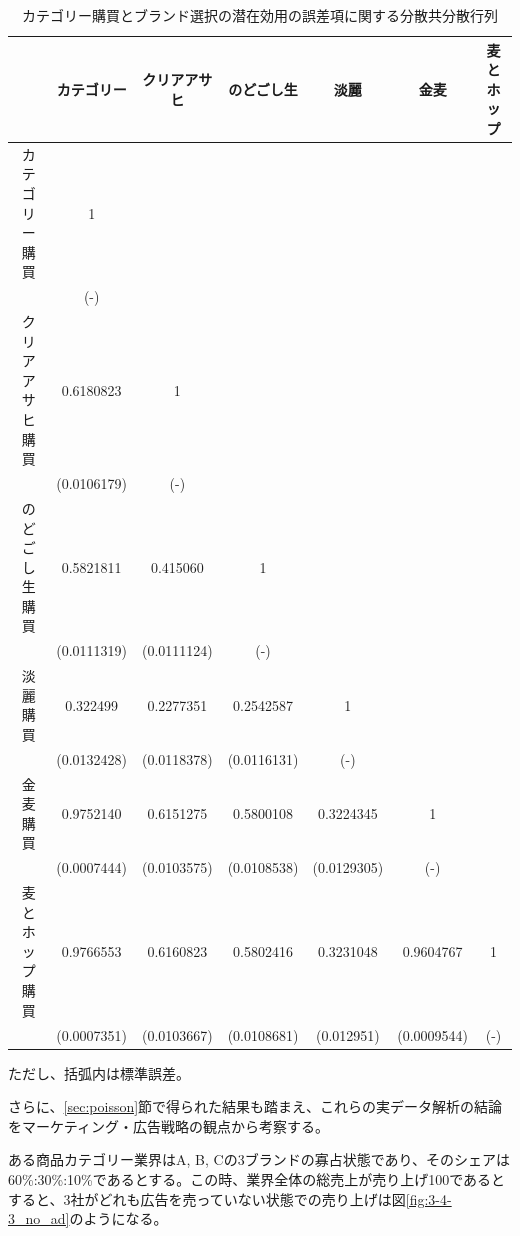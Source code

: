 \documentclass[11pt]{jsarticle}
\begin{document}
\begin{table}[htbp]
 \centering
  \caption{カテゴリー購買とブランド選択の潜在効用の誤差項に関する分散共分散行列}
\begin{center}
 \begin{tabular}{c|cccccc} \hline
   & カテゴリー & クリアアサヒ & のどごし生 & 淡麗 & 金麦 & 麦とホップ \\ \hline
カテゴリー購買 & 1 &  &  &  &  &  \\
   & (-) &  &  &  &  &  \\
クリアアサヒ購買 & 0.6180823 & 1 &  &  &  &  \\
 & (0.0106179) & (-) &  &  &  &  \\
のどごし生購買 & 0.5821811 & 0.415060 & 1 &  &  &  \\
 & (0.0111319) & (0.0111124) & (-) &  &  &  \\
淡麗購買 & 0.322499 & 0.2277351 & 0.2542587 & 1 &  &  \\
 & (0.0132428) & (0.0118378) & (0.0116131) & (-) &  &  \\
金麦購買 & 0.9752140 & 0.6151275 & 0.5800108 & 0.3224345 & 1 &  \\
 & (0.0007444) & (0.0103575) & (0.0108538) & (0.0129305) & (-) &  \\
麦とホップ購買 & 0.9766553 & 0.6160823 & 0.5802416 & 0.3231048 & 0.9604767 & 1 \\
 & (0.0007351) & (0.0103667) & (0.0108681) & (0.012951) & (0.0009544) & (-) \\
 \end{tabular}
 \label{tab:simultaneous_matrix}
 \end{center}
\end{table}
ただし、括弧内は標準誤差。

さらに、\ref{sec:poisson}節で得られた結果も踏まえ、これらの実データ解析の結論をマーケティング・広告戦略の観点から考察する。

ある商品カテゴリー業界はA, B, Cの3ブランドの寡占状態であり、そのシェアは60\%:30\%:10\%であるとする。この時、業界全体の総売上が売り上げ100であるとすると、3社がどれも広告を売っていない状態での売り上げは図\ref{fig:3-4-3_no_ad}のようになる。
\end{document}
